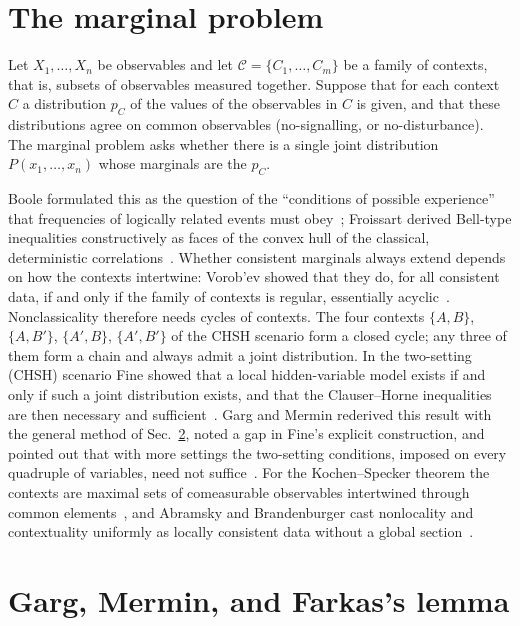 \documentclass[aps,pra,reprint,superscriptaddress,longbibliography,nofootinbib]{revtex4-2}
\begin{document}
\section{The marginal problem}
\label{sec:marginal}

Let $X_1,\ldots ,X_n$ be observables and let $\mathcal{C}=\{C_1,\ldots ,C_m\}$ be a family of contexts, that is, subsets of observables measured together.
Suppose that for each context $C$ a distribution $p_C$ of the values of the observables in $C$ is given, and that these distributions agree on common observables (no-signalling, or no-disturbance).
The marginal problem asks whether there is a single joint distribution $P(x_1,\ldots ,x_n)$ whose marginals are the $p_C$.

Boole formulated this as the question of the ``conditions of possible experience'' that frequencies of logically related events must obey~\cite{Boole-62,pitowsky-89a,Pit-94}; Froissart derived Bell-type inequalities constructively as faces of the convex hull of the classical, deterministic correlations~\cite{froissart-81}.
Whether consistent marginals always extend depends on how the contexts intertwine: Vorob'ev showed that they do, for all consistent data, if and only if the family of contexts is regular, essentially acyclic~\cite{Vorobev-1962}.
Nonclassicality therefore needs cycles of contexts.
The four contexts $\{A,B\}$, $\{A,B'\}$, $\{A',B\}$, $\{A',B'\}$ of the CHSH scenario form a closed cycle; any three of them form a chain and always admit a joint distribution.
In the two-setting (CHSH) scenario Fine showed that a local hidden-variable model exists if and only if such a joint distribution exists, and that the Clauser--Horne inequalities are then necessary and sufficient~\cite{Fine-82}. Garg and Mermin rederived this result with the general method of Sec.~\ref{sec:gm}, noted a gap in Fine's explicit construction, and pointed out that with more settings the two-setting conditions, imposed on every quadruple of variables, need not suffice~\cite{Garg1984}.
For the Kochen--Specker theorem the contexts are maximal sets of comeasurable observables intertwined through common elements~\cite{specker-60,kochen1}, and Abramsky and Brandenburger cast nonlocality and contextuality uniformly as locally consistent data without a global section~\cite{abramsky-brandenburger-2011}.

\section{Garg, Mermin, and Farkas's lemma}
\label{sec:gm}
\end{document}
